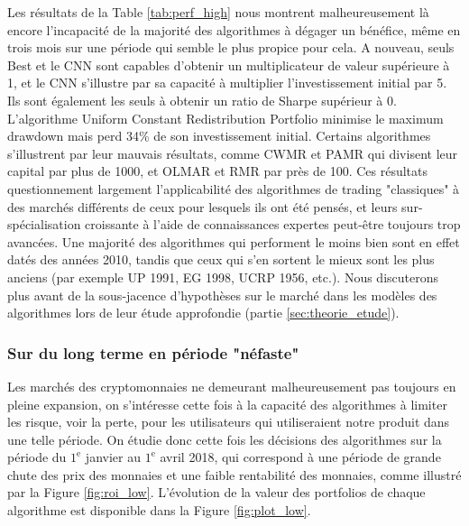 \documentclass[a4paper, 10pt]{article}
\begin{document}
Les résultats de la Table \ref{tab:perf_high} nous montrent malheureusement là encore l'incapacité de la majorité des algorithmes à dégager un bénéfice, même en trois mois   sur une période qui semble le plus propice pour cela. A nouveau, seuls Best et le CNN sont capables d'obtenir un multiplicateur de valeur supérieure à 1, et le CNN s'illustre par sa capacité à multiplier l'investissement initial par 5. Ils sont également les seuls à obtenir un ratio de Sharpe supérieur à 0. L'algorithme Uniform Constant Redistribution Portfolio minimise le maximum drawdown mais perd 34\% de son investissement initial. Certains algorithmes s'illustrent par leur mauvais résultats, comme CWMR et PAMR qui divisent leur capital par plus de 1000, et OLMAR et RMR par près de 100. Ces résultats questionnement largement l'applicabilité des algorithmes de trading "classiques" à des marchés différents de ceux pour lesquels ils ont été pensés, et leurs sur-spécialisation croissante à l'aide de connaissances expertes peut-être toujours trop avancées. Une majorité des algorithmes qui performent le moins bien sont en effet datés des années 2010, tandis que ceux qui s'en sortent le mieux sont les plus anciens (par exemple UP 1991, EG 1998, UCRP 1956, etc.). Nous discuterons plus avant de la sous-jacence d'hypothèses sur le marché dans les modèles des algorithmes lors de leur étude approfondie (partie \ref{sec:theorie_etude}).

\subsubsection{Sur du long terme en période "néfaste"}
\label{sec:theorie_empirique_nefaste}

Les marchés des cryptomonnaies ne demeurant malheureusement pas toujours en pleine expansion, on s'intéresse cette fois à la capacité des algorithmes à limiter les risque, voir la perte, pour les utilisateurs qui utiliseraient notre produit dans une telle période. On étudie donc cette fois les décisions des algorithmes sur la période du $1^{\text{e}}$ janvier au $1^{\text{e}}$ avril 2018, qui correspond à une période de grande chute des prix des monnaies et une faible rentabilité des monnaies, comme illustré par la Figure \ref{fig:roi_low}. L'évolution de la valeur des portfolios de chaque algorithme est disponible dans la Figure \ref{fig:plot_low}.
\end{document}
